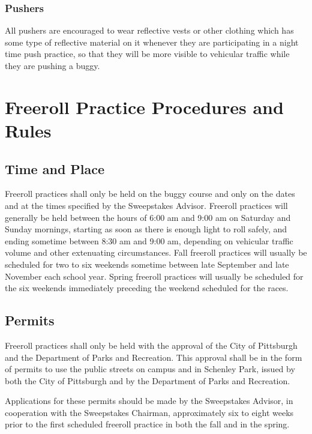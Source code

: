 \subsubsection{Pushers}

	All pushers are encouraged to wear reflective vests or other clothing which has
	some type of reflective material on it whenever they are participating in a
	night time push practice, so that they will be more visible to vehicular
	traffic while they are pushing a buggy.

\section{Freeroll Practice Procedures and Rules}

\subsection{Time and Place}

	Freeroll practices shall only be held on the buggy course and only on the dates
	and at the times specified by the Sweepstakes Advisor. Freeroll practices will
	generally be held between the hours of 6:00 am and 9:00 am on Saturday and
	Sunday mornings, starting as soon as there is enough light to roll safely, and
	ending sometime between 8:30 am and 9:00 am, depending on vehicular traffic
	volume and other extenuating circumstances. Fall freeroll practices will
	usually be scheduled for two to six weekends sometime between late September
	and late November each school year. Spring freeroll practices will usually be
	scheduled for the six weekends immediately preceding the weekend scheduled for
	the races.

\subsection{Permits}

	Freeroll practices shall only be held with the approval of the City of
	Pittsburgh and the Department of Parks and Recreation. This approval shall be
	in the form of permits to use the public streets on campus and in Schenley
	Park, issued by both the City of Pittsburgh and by the Department of Parks and
	Recreation.

	Applications for these permits should be made by the Sweepstakes Advisor, in
	cooperation with the Sweepstakes Chairman, approximately six to eight weeks
	prior to the first scheduled freeroll practice in both the fall and in the
	spring.

